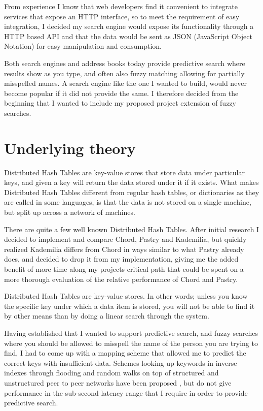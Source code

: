 From experience I know that web developers find it convenient to integrate services that expose an HTTP interface, so to meet the requirement of easy integration, I decided my search engine would expose its functionality through a HTTP based API and that the data would be sent as JSON (JavaScript Object Notation) for easy manipulation and consumption.

Both search engines and address books today provide predictive search where results show as you type, and often also fuzzy matching allowing for partially misspelled names. A search engine like the one I wanted to build, would never become popular if it did not provide the same. I therefore decided from the beginning that I wanted to include my proposed project extension of fuzzy searches.

\section{Underlying theory}
Distributed Hash Tables are key-value stores that store data under particular keys, and given a key will return the data stored under it if it exists.
What makes Distributed Hash Tables different from regular hash tables, or dictionaries as they are called in some languages, is that the data is not stored on a single machine, but split up across a network of machines.

There are quite a few well known Distributed Hash Tables. After initial research I decided to implement and compare Chord, Pastry and Kademilia, but quickly realized Kademilia differs from Chord in ways similar to what Pastry already does, and decided to drop it from my implementation, giving me the added benefit of more time along my projects critical path that could be spent on a more thorough evaluation of the relative performance of Chord and Pastry.

\mbox{}

Distributed Hash Tables are key-value stores. In other words; unless you know the specific key under which a data item is stored, you will not be able to find it by other means than by doing a linear search through the system.

Having established that I wanted to support predictive search, and fuzzy searches where you should be allowed to misspell the name of the person you are trying to find, I had to come up with a mapping scheme that allowed me to predict the correct keys with insufficient data. 
Schemes looking up keywords in inverse indexes through flooding and random walks on top of structured and unstructured peer to peer networks have been proposed \cite{myths}, but do not give performance in the sub-second latency range that I require in order to provide predictive search.

